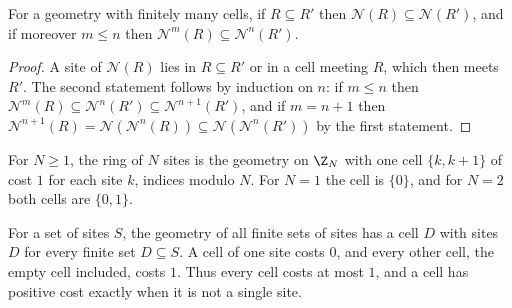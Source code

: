\begin{lemma}
    \label{lem:circuits_neighbourhood_mono}
    \leanok
    For a geometry with finitely many cells, if $R\subseteq R'$ then
    $\mathcal N(R)\subseteq\mathcal N(R')$, and if moreover
    $m\leq n$ then $\mathcal N^m(R)\subseteq\mathcal N^n(R')$.
\end{lemma}
\begin{proof}\leanok
    A site of $\mathcal N(R)$ lies in $R\subseteq R'$ or in a cell meeting $R$, which
    then meets $R'$. The second statement follows by induction on $n$: if
    $m\leq n$ then
    $\mathcal N^m(R)\subseteq\mathcal N^n(R')\subseteq\mathcal N^{n+1}(R')$, and
    if $m=n+1$ then $\mathcal N^{n+1}(R)=\mathcal N(\mathcal N^n(R))\subseteq
    \mathcal N(\mathcal N^n(R'))$ by the first statement.
\end{proof}

\begin{definition}
    \label{def:circuits_ring_geometry}
    \leanok
    For $N\ge1$, the ring of $N$ sites is the geometry on $\Z_N$ with one cell
    $\{k,k+1\}$ of cost $1$ for each site $k$, indices modulo $N$. For $N=1$ the cell is
    $\{0\}$, and for $N=2$ both cells are $\{0,1\}$.
\end{definition}

\begin{definition}
    \label{def:circuits_subsets_geometry}
    \leanok
    For a set of sites $S$, the geometry of all finite sets of sites has a cell $D$
    with sites $D$ for every finite set $D\subseteq S$. A cell of one site costs $0$,
    and every other cell, the empty cell included, costs $1$. Thus every cell costs
    at most $1$, and a cell has positive cost exactly when it is not a single site.
\end{definition}


